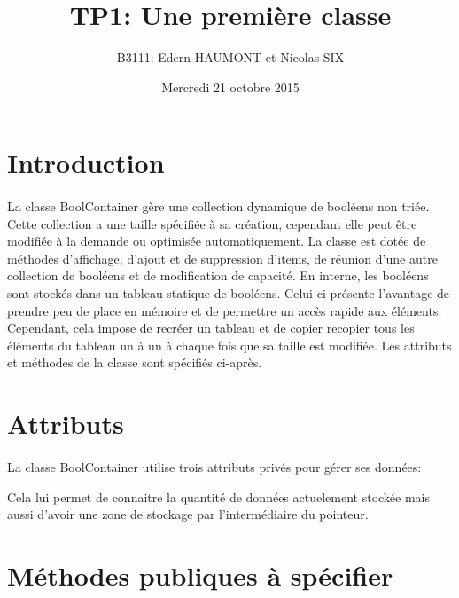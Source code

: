 \documentclass[a4paper, 12pts]{article}
\title{TP1: Une première classe}
\author{B3111: Edern HAUMONT et Nicolas SIX}
\date{Mercredi 21 octobre 2015}
\begin{document}
\begin{titlepage}

\maketitle

\end{titlepage}


\tableofcontents

\pagebreak


\section{Introduction}
\paragraph{}
La classe BoolContainer gère une collection dynamique de booléens non triée. Cette collection a une taille spécifiée à sa création, cependant elle peut être modifiée à la demande ou optimisée automatiquement.
La classe est dotée de méthodes d’affichage, d’ajout et de suppression d’items, de réunion d’une autre collection de booléens et de modification de capacité.
En interne, les booléens sont stockés dans un tableau statique de booléens. Celui-ci présente l'avantage de prendre peu de place en mémoire et de permettre un accès rapide aux éléments. Cependant, cela impose de recréer un tableau et de copier recopier tous les éléments du tableau un à un à chaque fois que sa taille est modifiée.
Les attributs et méthodes de la classe sont spécifiés ci-après.

\section{Attributs}
\paragraph{}
La classe BoolContainer utilise trois attributs privés pour gérer ses données:

Cela lui permet de connaitre la quantité de données actuelement stockée mais aussi d'avoir une zone de stockage par l'intermédiaire du pointeur.

\section{Méthodes publiques à spécifier}
\end{document}
